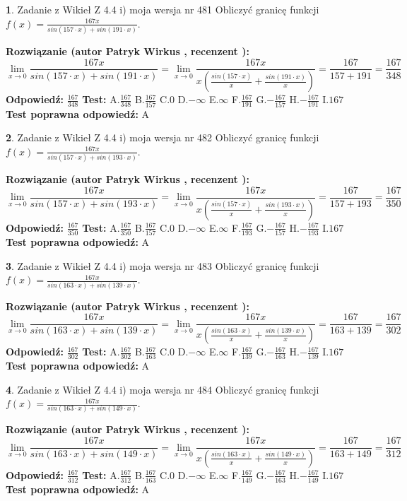 \documentclass[12pt, a4paper]{article}
\theoremstyle{definition} %
\newtheorem{zad}{}
\newcommand{\zadStart}[1]{\begin{zad}#1\newline}
\newcommand{\zadStop}{\end{zad}}
\newcommand{\rozwStart}[2]{\noindent \textbf{Rozwiązanie (autor #1 , recenzent #2): }\newline}
\newcommand{\rozwStop}{\newline}
\newcommand{\odpStart}{\noindent \textbf{Odpowiedź:}\newline}
\newcommand{\odpStop}{\newline}
\newcommand{\testStart}{\noindent \textbf{Test:}\newline}
\newcommand{\testStop}{\newline}
\newcommand{\kluczStart}{\noindent \textbf{Test poprawna odpowiedź:}\newline}
\newcommand{\kluczStop}{\newline}
\begin{document}
\zadStart{Zadanie z Wikieł Z 4.4 i) moja wersja nr 481}
Obliczyć granicę funkcji $f(x)=\frac{167x}{sin(157\cdot x) +sin(191\cdot x)}$.
\zadStop
\rozwStart{Patryk Wirkus}{}
$$\lim\limits_{x\to 0}\frac{167x}{sin(157\cdot x) +sin(191\cdot x)}=\lim\limits_{x\to 0}\frac{167x}{x(\frac{sin(157\cdot x)}{x}+\frac{sin(191\cdot x)}{x})}=\frac{167}{157+191} = \frac{167}{348}$$
\rozwStop
\odpStart
$\frac{167}{348}$
\odpStop
\testStart
A.$\frac{167}{348}$
B.$\frac{167}{157}$
C.$0$
D.$-\infty$
E.$\infty$
F.$\frac{167}{191}$
G.$-\frac{167}{157}$
H.$-\frac{167}{191}$
I.$167$
\testStop
\kluczStart
A
\kluczStop



\zadStart{Zadanie z Wikieł Z 4.4 i) moja wersja nr 482}
Obliczyć granicę funkcji $f(x)=\frac{167x}{sin(157\cdot x) +sin(193\cdot x)}$.
\zadStop
\rozwStart{Patryk Wirkus}{}
$$\lim\limits_{x\to 0}\frac{167x}{sin(157\cdot x) +sin(193\cdot x)}=\lim\limits_{x\to 0}\frac{167x}{x(\frac{sin(157\cdot x)}{x}+\frac{sin(193\cdot x)}{x})}=\frac{167}{157+193} = \frac{167}{350}$$
\rozwStop
\odpStart
$\frac{167}{350}$
\odpStop
\testStart
A.$\frac{167}{350}$
B.$\frac{167}{157}$
C.$0$
D.$-\infty$
E.$\infty$
F.$\frac{167}{193}$
G.$-\frac{167}{157}$
H.$-\frac{167}{193}$
I.$167$
\testStop
\kluczStart
A
\kluczStop



\zadStart{Zadanie z Wikieł Z 4.4 i) moja wersja nr 483}
Obliczyć granicę funkcji $f(x)=\frac{167x}{sin(163\cdot x) +sin(139\cdot x)}$.
\zadStop
\rozwStart{Patryk Wirkus}{}
$$\lim\limits_{x\to 0}\frac{167x}{sin(163\cdot x) +sin(139\cdot x)}=\lim\limits_{x\to 0}\frac{167x}{x(\frac{sin(163\cdot x)}{x}+\frac{sin(139\cdot x)}{x})}=\frac{167}{163+139} = \frac{167}{302}$$
\rozwStop
\odpStart
$\frac{167}{302}$
\odpStop
\testStart
A.$\frac{167}{302}$
B.$\frac{167}{163}$
C.$0$
D.$-\infty$
E.$\infty$
F.$\frac{167}{139}$
G.$-\frac{167}{163}$
H.$-\frac{167}{139}$
I.$167$
\testStop
\kluczStart
A
\kluczStop



\zadStart{Zadanie z Wikieł Z 4.4 i) moja wersja nr 484}
Obliczyć granicę funkcji $f(x)=\frac{167x}{sin(163\cdot x) +sin(149\cdot x)}$.
\zadStop
\rozwStart{Patryk Wirkus}{}
$$\lim\limits_{x\to 0}\frac{167x}{sin(163\cdot x) +sin(149\cdot x)}=\lim\limits_{x\to 0}\frac{167x}{x(\frac{sin(163\cdot x)}{x}+\frac{sin(149\cdot x)}{x})}=\frac{167}{163+149} = \frac{167}{312}$$
\rozwStop
\odpStart
$\frac{167}{312}$
\odpStop
\testStart
A.$\frac{167}{312}$
B.$\frac{167}{163}$
C.$0$
D.$-\infty$
E.$\infty$
F.$\frac{167}{149}$
G.$-\frac{167}{163}$
H.$-\frac{167}{149}$
I.$167$
\testStop
\kluczStart
A
\kluczStop
\end{document}
